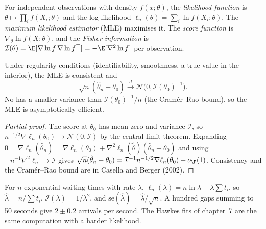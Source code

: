\begin{definition}\label{def:qm:estimation:mle}
For independent observations with density $f(x; \theta)$, the \emph{likelihood function} is
$\theta \mapsto \prod_if(X_i; \theta)$ and the log-likelihood $\ell_n(\theta) = \sum_i\ln f(X_i; \theta)$. The \emph{maximum
likelihood estimator} (MLE) maximises it. The \emph{score function} is $\nabla_\theta\ln f(X; \theta)$, and the \emph{Fisher information} is $\mathcal I(\theta) =
\E[\nabla\ln f\,\nabla\ln f^\top] = -\E[\nabla^2\ln f]$ per observation.
\end{definition}

\begin{theorem}\label{thm:qm:estimation:mle}
Under regularity conditions (identifiability, smoothness, a true value in the interior), the MLE is consistent and
\[
\sqrt n(\hat\theta_n - \theta_0) \xrightarrow{d} \mathcal N\bigl(0, \mathcal I(\theta_0)^{-1}\bigr).
\]
No  has a smaller variance than $\mathcal I(\theta_0)^{-1}/n$ (the Cramér--Rao bound), so the MLE is
asymptotically efficient.
\end{theorem}

\begin{proof}[Partial proof]
The score at $\theta_0$ has mean zero and variance $\mathcal I$, so $n^{-1/2}\nabla\ell_n(\theta_0) \to \mathcal N(0, \mathcal I)$ by the central
limit theorem. Expanding $0 = \nabla\ell_n(\hat\theta_n) = \nabla\ell_n(\theta_0) + \nabla^2\ell_n(\tilde\theta)(\hat\theta_n - \theta_0)$ and using
$-n^{-1}\nabla^2\ell_n \to \mathcal I$ gives $\sqrt n(\hat\theta_n - \theta_0) = \mathcal I^{-1}n^{-1/2}\nabla\ell_n(\theta_0) + o_{\P}(1)$. Consistency
and the Cramér--Rao bound are in Casella and Berger (2002).
\end{proof}

\begin{example}\label{ex:qm:estimation:rate}
For $n$ exponential waiting times with rate $\lambda$, $\ell_n(\lambda) = n\ln\lambda - \lambda\sum t_i$, so $\hat\lambda = n/\sum t_i$, $\mathcal I(\lambda) =
1/\lambda^2$, and $\mathrm{se}(\hat\lambda) = \hat\lambda/\sqrt n$. A hundred gaps summing to 50 seconds give $2 \pm 0.2$ arrivals per second.
The Hawkes fits of chapter~7 are the same computation with a harder likelihood.
\end{example}

